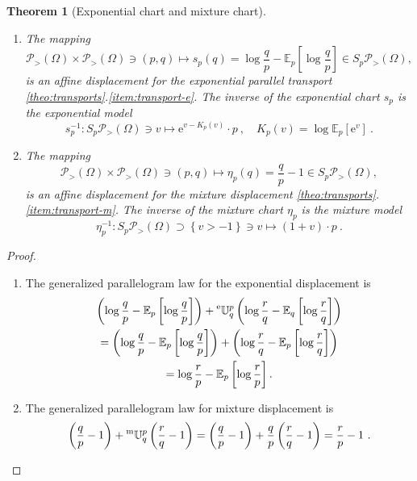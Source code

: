\documentclass[axioms,article,submit,pdftex,moreauthors]{Definitions/mdpi}
\theoremstyle{plain}
\newtheorem{theo}{Theorem}
\theoremstyle{remark}
\newcommand{\Expectation}{\mathbb E}
\newcommand{\etransport}[2]{\prescript{\text{e}}{} {\mathbb U} _ {#1} ^ {#2}}
\newcommand{\euler}{\mathrm{e}}
\newcommand{\expectat}[2]{\Expectation_{#1}\left[#2\right]}
\newcommand{\expfibreat}[2]{S_{#1}\pdensitieson{#2}}
\newcommand{\mtransport}[2]{\prescript{\text{m}}{} {\mathbb U} _ {#1} ^ {#2}}
\newcommand{\pdensitieson}[1]{\mathcal P_{>}\left(#1\right)}
\newcommand{\set}[1]{\left\{#1\right\}}
\begin{document}
\begin{theo} [Exponential chart and mixture chart] \label{theo:charts}
 \begin{enumerate}\ 
     \item The mapping
\begin{equation*} 
\pdensitieson\Omega \times \pdensitieson\Omega \ni (p, q) \mapsto s_{p}(q) = \log \frac{q}{p} - \expectat p {\log \frac{q}{p}} \in \expfibreat p \Omega,
\end{equation*} 
is an affine displacement for the exponential parallel transport \ref{theo:transports}.\ref{item:transport-e}. The inverse of the \emph{exponential chart} $s_p$ is the exponential model 
\begin{equation*}
   s_p^{-1} \colon \expfibreat p \Omega \ni v \mapsto \euler^{v - K_p(v)} \cdot p \ , \quad K_p(v) = \log \expectat p {\euler^v} \ .
\end{equation*}
\item The mapping
\begin{equation*} 
\pdensitieson\Omega \times \pdensitieson\Omega \ni (p, q) \mapsto \eta_p(q) = \frac{q}{p} - 1 \in \expfibreat p \Omega,
\end{equation*} 
is an affine displacement for the mixture displacement  \ref{theo:transports}.\ref{item:transport-m}. The inverse of the \emph{mixture chart} $\eta_p$ is the mixture model 
\begin{equation*}
   \eta_p^{-1} \colon \expfibreat p \Omega \supset \set{v > -1} \ni v \mapsto (1 + v) \cdot p \ .
\end{equation*}
 \end{enumerate}   
\end{theo}

\begin{proof}
\begin{enumerate}
\item The generalized parallelogram law for the exponential displacement is
\begin{multline*}
    \left(\log \frac{q}{p} - \expectat p {\log \frac{q}{p}}\right) 
    + \etransport q p \left(\log \frac{r}{q} - \expectat q {\log \frac{r}{q}}\right) \\
    = \left(\log \frac{q}{p} - \expectat p {\log \frac{q}{p}}\right) + \left(\log \frac{r}{q} - \expectat p {\log \frac{r}{q}}\right) \\
    = \log \frac{r}{p} - \expectat p {\log \frac{r}{p}}. 
\end{multline*} 
\item The generalized parallelogram law for mixture displacement is
\begin{equation*}
    \left(\frac q p - 1\right) + \mtransport q p \left(\frac r q - 1 \right) = \left(\frac q p -1\right) + \frac q p   \left(\frac r q -1\right) = \frac r p -1 \ .
\end{equation*}
\end{enumerate}
\phantom{qed}
\end{proof}
\end{document}

